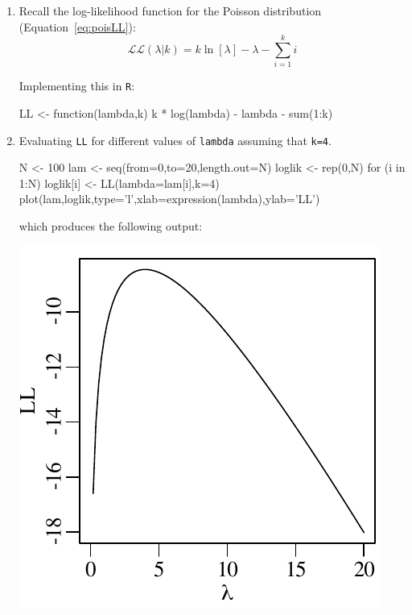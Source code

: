\begin{enumerate}
\item Recall the log-likelihood function for the Poisson distribution
  (Equation~\ref{eq:poisLL}):
\[
  \mathcal{LL}(\lambda|k) = k \ln[\lambda] - \lambda - \sum\limits_{i=1}^{k}i
\]

Implementing this in \texttt{R}:

\begin{script}
LL <- function(lambda,k){
  k * log(lambda) - lambda - sum(1:k)
}
\end{script}

\item Evaluating \texttt{LL} for different values of \texttt{lambda}
  assuming that \texttt{k=4}.

\begin{script}[firstnumber=4]
N <- 100
lam <- seq(from=0,to=20,length.out=N)
loglik <- rep(0,N)
for (i in 1:N){
  loglik[i] <- LL(lambda=lam[i],k=4)
}
plot(lam,loglik,type='l',xlab=expression(lambda),ylab='LL')
\end{script}

\noindent which produces the following output:

\noindent\begin{minipage}[t][][b]{.3\linewidth}
  \includegraphics[width=\textwidth]{../figures/LLpois.pdf}\medskip
\end{minipage}
\begin{minipage}[t][][t]{.7\linewidth}
  \label{fig:LLpois}
\end{minipage}


\end{enumerate}
